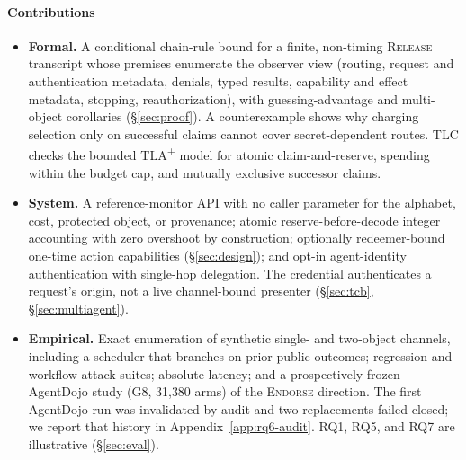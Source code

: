 \documentclass[conference,compsoc]{IEEEtran}
\newcommand{\rev}[1]{#1} %
\begin{document}
\paragraph{Contributions}
\begin{itemize}
\item \textbf{Formal.} \rev{A conditional chain-rule bound for a finite, non-timing \textsc{Release} transcript whose premises enumerate the observer view (routing, request and authentication metadata, denials, typed results, capability and effect metadata, stopping, reauthorization), with guessing-advantage and multi-object corollaries (\S\ref{sec:proof}). A counterexample shows why charging selection only on successful claims cannot cover secret-dependent routes. TLC checks the bounded TLA\textsuperscript{+} model for atomic claim-and-reserve, spending within the budget cap, and mutually exclusive successor claims.}
\item \textbf{System.} \rev{A reference-monitor API with no caller parameter for the alphabet, cost, protected object, or provenance; atomic reserve-before-decode integer accounting with zero overshoot by construction; optionally redeemer-bound one-time action capabilities (\S\ref{sec:design}); and opt-in agent-identity authentication with single-hop delegation. The credential authenticates a request's origin, not a live channel-bound presenter (\S\ref{sec:tcb}, \S\ref{sec:multiagent}).}
\item \textbf{Empirical.} \rev{Exact enumeration of synthetic single- and two-object channels, including a scheduler that branches on prior public outcomes; regression and workflow attack suites; absolute latency; and a prospectively frozen AgentDojo study (G8, 31{,}380 arms) of the \textsc{Endorse} direction. The first AgentDojo run was invalidated by audit and two replacements failed closed; we report that history in Appendix~\ref{app:rq6-audit}. RQ1, RQ5, and RQ7 are illustrative (\S\ref{sec:eval}).}
\end{itemize}
\end{document}
